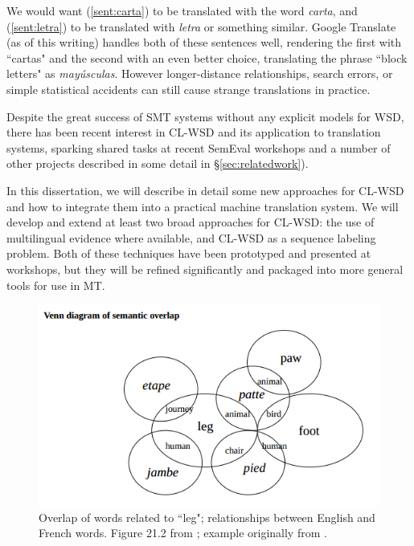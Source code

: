 \label{sent:carta}
\label{sent:letra}

We would want (\ref{sent:carta}) to be translated with the word \emph{carta},
and (\ref{sent:letra}) to be translated with \emph{letra} or something similar.
Google Translate (as of this writing) handles both of these sentences well,
rendering the first with ``cartas" and the second with an even better choice,
translating the phrase ``block letters" as \emph{mayúsculas}.
However longer-distance relationships, search errors, or simple statistical
accidents can still cause strange translations in practice.

Despite the great success of SMT systems without any explicit models for WSD,
there has been recent interest in CL-WSD and its application to translation
systems, sparking shared tasks at recent SemEval workshops
\cite{lefever-hoste:2010:SemEval,task10} and a number of other projects
described in some detail in \S\ref{sec:relatedwork}).

In this dissertation, we will describe in detail some new approaches for CL-WSD
and how to integrate them into a practical machine translation system.
We will develop and extend at least two broad approaches for CL-WSD: the use of
multilingual evidence where available, and CL-WSD as a sequence labeling
problem.
Both of these techniques have been prototyped and presented at workshops, but
they will be refined significantly and packaged into more general tools for use
in MT.  

\begin{figure}
  \includegraphics[width=12cm]{hutchins-leg-etc.png}
  \caption{Overlap of words related to ``leg"; relationships between English
  and French words. Figure 21.2 from \protect\cite{slp1}; example originally
  from \protect\cite[Chapter 6]{hutchins1992introduction}.}
  \label{fig:leg}
\end{figure}


